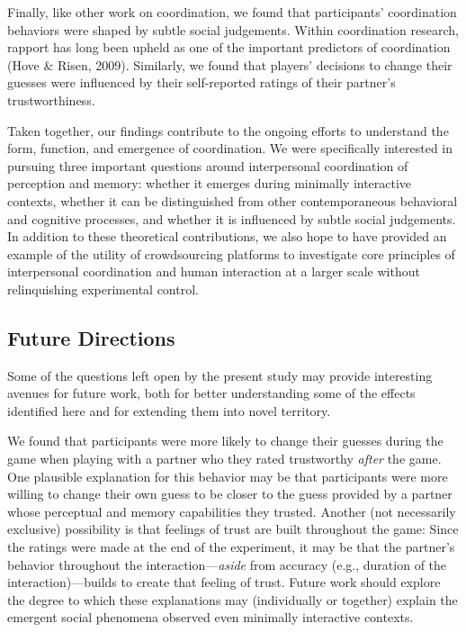\documentclass[10pt, letterpaper]{article}
\begin{document}
Finally, like other work on coordination, we found that participants'
coordination behaviors were shaped by subtle social judgements. Within
coordination research, rapport has long been upheld as one of the
important predictors of coordination (Hove \& Risen, 2009). Similarly,
we found that players' decisions to change their guesses were influenced
by their self-reported ratings of their partner's trustworthiness.

Taken together, our findings contribute to the ongoing efforts to
understand the form, function, and emergence of coordination. We were
specifically interested in pursuing three important questions around
interpersonal coordination of perception and memory: whether it emerges
during minimally interactive contexts, whether it can be distinguished
from other contemporaneous behavioral and cognitive processes, and
whether it is influenced by subtle social judgements. In addition to
these theoretical contributions, we also hope to have provided an
example of the utility of crowdsourcing platforms to investigate core
principles of interpersonal coordination and human interaction at a
larger scale without relinquishing experimental control.

\subsection{Future Directions}\label{future-directions}

Some of the questions left open by the present study may provide
interesting avenues for future work, both for better understanding some
of the effects identified here and for extending them into novel
territory.

We found that participants were more likely to change their guesses
during the game when playing with a partner who they rated trustworthy
\emph{after} the game. One plausible explanation for this behavior may
be that participants were more willing to change their own guess to be
closer to the guess provided by a partner whose perceptual and memory
capabilities they trusted. Another (not necessarily exclusive)
possibility is that feelings of trust are built throughout the game:
Since the ratings were made at the end of the experiment, it may be that
the partner's behavior throughout the interaction---\emph{aside} from
accuracy (e.g., duration of the interaction)---builds to create that
feeling of trust. Future work should explore the degree to which these
explanations may (individually or together) explain the emergent social
phenomena observed even minimally interactive contexts.
\end{document}
